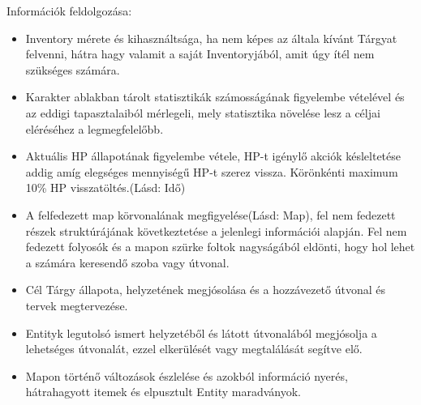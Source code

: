 \noindent Információk feldolgozása:
\begin{itemize}
    \item Inventory mérete és kihasználtsága, ha nem képes az általa kívánt Tárgyat felvenni, hátra hagy valamit a saját Inventoryjából, amit úgy ítél nem szükséges számára.
    \item Karakter ablakban tárolt statisztikák számosságának figyelembe vételével és az eddigi tapasztalaiból mérlegeli, mely statisztika növelése lesz a céljai eléréséhez a legmegfelelőbb.
    \item Aktuális HP állapotának figyelembe vétele, HP-t igénylő akciók késleltetése addig amíg elegséges mennyiségű HP-t szerez vissza. Körönkénti maximum 10\% HP visszatöltés.(Lásd: Idő)
    \item A felfedezett map körvonalának megfigyelése(Lásd: Map), fel nem fedezett részek struktúrájának következtetése a jelenlegi információi alapján. Fel nem fedezett folyosók és a mapon szürke foltok nagyságából eldönti, hogy hol lehet a számára keresendő szoba vagy útvonal.
    \item Cél Tárgy állapota, helyzetének megjósolása és a hozzávezető útvonal és tervek megtervezése.
    \item Entityk legutolsó ismert helyzetéből és látott útvonalából megjósolja a lehetséges útvonalát, ezzel elkerülését vagy megtalálását segítve elő.
    \item Mapon történő változások észlelése és azokból információ nyerés, hátrahagyott itemek és elpusztult Entity maradványok.
\end{itemize}

